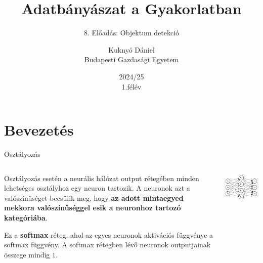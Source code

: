 \documentclass[english, aspectratio=169]{beamer}
\makeatletter
\newcommand\makebeamertitle{\frame{\maketitle}}
\let\origtableofcontents=\tableofcontents
\def\tableofcontents{\@ifnextchar[{\origtableofcontents}{\gobbletableofcontents}}
\def\gobbletableofcontents#1{\origtableofcontents}
\makeatother
\begin{document}
	
	\section{Bevezetés}
	\title[]{Adatbányászat a Gyakorlatban}
	\subtitle{8. Előadás: Objektum detekció}
	\author[Kuknyó Dániel]{Kuknyó Dániel\\Budapesti Gazdasági Egyetem}
	\date{2024/25\\1.félév}
	\makebeamertitle
	
	\begin{frame}
		\tableofcontents{}
	\end{frame}
	
	\begin{frame}
		\tableofcontents[currentsection]
	\end{frame}
	
	\begin{frame}{Osztályozás}
		\begin{columns}
			\begin{column}{.5\textwidth}
				Osztályozás esetén a neurális hálózat output rétegében minden lehetséges osztályhoz egy neuron tartozik. A neuronok azt a valószínűséget becsülik meg, hogy \textbf{az adott mintaegyed mekkora valószínűséggel esik a neuronhoz tartozó kategóriába}.\par\smallskip
				Ez a \textbf{softmax} réteg, ahol az egyes neuronok aktivációs függvénye a softmax függvény. A softmax rétegben lévő neuronok outputjainak összege mindig $1$.
			\end{column}
			\begin{column}{.5\textwidth}
				\begin{center}
					\includegraphics[width=7cm, keepaspectratio]{../../7_dl/doc/graphs/dl_1.png}
				\end{center}
			\end{column}
		\end{columns}
	\end{frame}
	
\end{document}
